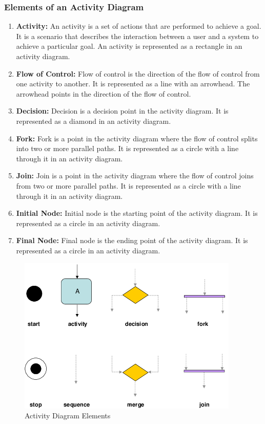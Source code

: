 \documentclass[11pt]{article}
\begin{document}
\subsubsection{Elements of an Activity Diagram}

\begin{enumerate}
	\item \textbf{Activity:} An activity is a set of actions that are performed to achieve a goal. It is a scenario that describes the interaction between a user and a system to achieve a particular goal. An activity is represented as a rectangle in an activity diagram.
	\item \textbf{Flow of Control:} Flow of control is the direction of the flow of control from one activity to another. It is represented as a line with an arrowhead. The arrowhead points in the direction of the flow of control.
	\item \textbf{Decision:} Decision is a decision point in the activity diagram. It is represented as a diamond in an activity diagram.
	\item \textbf{Fork:} Fork is a point in the activity diagram where the flow of control splits into two or more parallel paths. It is represented as a circle with a line through it in an activity diagram.
	\item \textbf{Join:} Join is a point in the activity diagram where the flow of control joins from two or more parallel paths. It is represented as a circle with a line through it in an activity diagram.
	\item \textbf{Initial Node:} Initial node is the starting point of the activity diagram. It is represented as a circle in an activity diagram.
	\item \textbf{Final Node:} Final node is the ending point of the activity diagram. It is represented as a circle in an activity diagram.
\end{enumerate}

\begin{figure}[H]
	\centering
	\includegraphics[width=.8\textwidth]{UML-Activity-Diagram-elements.png}
	\caption{Activity Diagram Elements}
\end{figure}
\end{document}
